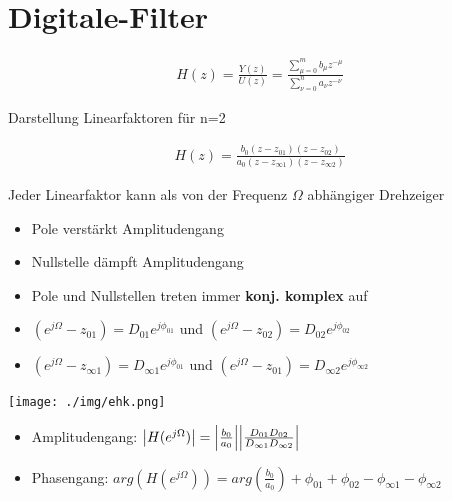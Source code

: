 \documentclass[10pt,a4paper]{article}
\begin{document}
\section{Digitale-Filter}
  \begin{mdframed}[style=exercise]
    \begin{align}
        H(z)=\frac{Y(z)}{U(z)}= \frac{\sum_{\mu=0}^{m} b_\mu z^{-\mu}}{\sum_{\nu=0}^{n} a_\nu z^{-\nu}}
    \end{align}
  \end{mdframed}
Darstellung Linearfaktoren für n=2
  \begin{mdframed}[style=exercise]
    \begin{align}
        H(z)=\frac{b_0(z-z_{01})(z-z_{02})}{a_0(z-z_{\infty 1})(z-z_{\infty 2})}
    \end{align}
  \end{mdframed}
Jeder Linearfaktor kann als von der Frequenz $\Omega$ abhängiger Drehzeiger
\begin{itemize}
    \item Pole verstärkt Amplitudengang
    \item Nullstelle dämpft Amplitudengang
    \item Pole und Nullstellen treten immer \textbf{konj. komplex} auf
\end{itemize}
\begin{itemize}
    \item $(e^{j\Omega}-z_{01}) = D_{01}e^{j\phi_{01}}$ und $(e^{j\Omega}-z_{02}) = D_{02}e^{j\phi_{02}}$
    \item $(e^{j\Omega}-z_{\infty 1}) = D_{\infty 1}e^{j\phi_{01}}$ und $(e^{j\Omega}-z_{01}) = D_{\infty 2}e^{j\phi_{\infty 2}}$
\end{itemize}
  \begin{center}
      \texttt{[image: ./img/ehk.png]}
  \end{center}
\begin{itemize}
    \item Amplitudengang: $\abs{H(e^{j\Omega})}=\abs{\frac{b_0}{a_0}} \abs{ \frac{D_{01}D_{02}}{D_{\infty 1}D_{\infty 2}}}$
    \item Phasengang: $arg({H(e^{j\Omega})})=arg(\frac{b_0}{a_0}) +\phi_{01} +\phi_{02}-\phi_{\infty 1}-\phi_{\infty 2}$
\end{itemize}
\end{document}
